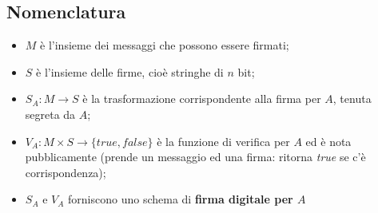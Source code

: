 \documentclass[11pt, a4paper, twoside, italian]{report}
\theoremstyle{plain}
\begin{document}
\subsection*{Nomenclatura}
\begin{itemize}
	\item $M$ è l'insieme dei messaggi che possono essere firmati;
	\item $S$ è l'insieme delle firme, cioè stringhe di $n$ bit;
	\item $S_{A}: M \longrightarrow S$ è la trasformazione corrispondente alla firma per $A$, tenuta segreta da $A$;
	\item $V_{A}: M \times S \longrightarrow \{true,false\}$ è la funzione di verifica per $A$ ed è nota pubblicamente (prende un messaggio ed una firma: ritorna \textit{true} se c'è corrispondenza);
	\item $S_{A}$ e $V_{A}$ forniscono uno schema di \textbf{firma digitale per $A$}
\end{itemize}
\end{document}
